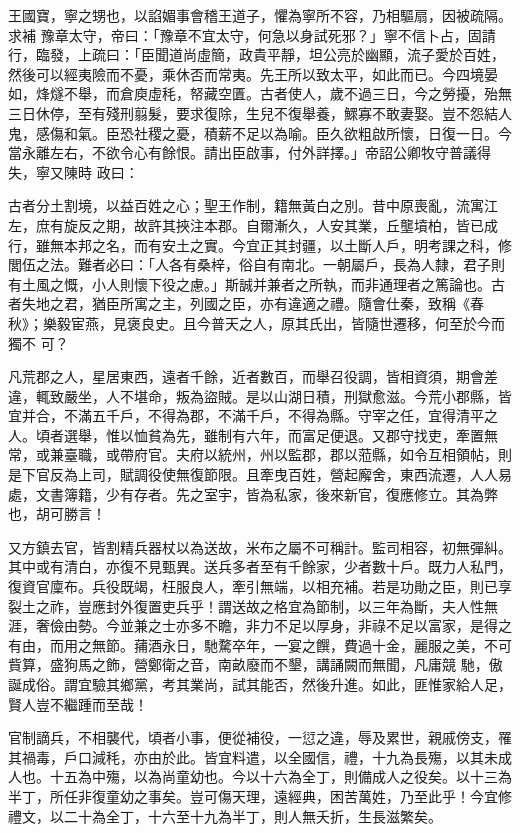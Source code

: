 \begin{pinyinscope}
 王國寶，寧之甥也，以諂媚事會稽王道子，懼為寧所不容，乃相驅扇，因被疏隔。求補
 豫章太守，帝曰：「豫章不宜太守，何急以身試死邪？」寧不信卜占，固請行，臨發，上疏曰：「臣聞道尚虛簡，政貴平靜，坦公亮於幽顯，流子愛於百姓，然後可以經夷險而不憂，乘休否而常夷。先王所以致太平，如此而已。今四境晏如，烽燧不舉，而倉庾虛秏，帑藏空匱。古者使人，歲不過三日，今之勞擾，殆無三日休停，至有殘刑翦髮，要求復除，生兒不復舉養，鰥寡不敢妻娶。豈不怨結人鬼，感傷和氣。臣恐社稷之憂，積薪不足以為喻。臣久欲粗啟所懷，日復一日。今當永離左右，不欲令心有餘恨。請出臣啟事，付外詳擇。」帝詔公卿牧守普議得失，寧又陳時
 政曰：



 古者分土割境，以益百姓之心；聖王作制，籍無黃白之別。昔中原喪亂，流寓江左，庶有旋反之期，故許其挾注本郡。自爾漸久，人安其業，丘壟墳柏，皆已成行，雖無本邦之名，而有安土之實。今宜正其封疆，以土斷人戶，明考課之科，修閭伍之法。難者必曰：「人各有桑梓，俗自有南北。一朝屬戶，長為人隸，君子則有土風之慨，小人則懷下役之慮。」斯誠并兼者之所執，而非通理者之篤論也。古者失地之君，猶臣所寓之主，列國之臣，亦有違適之禮。隨會仕秦，致稱《春秋》；樂毅宦燕，見褒良史。且今普天之人，原其氏出，皆隨世遷移，何至於今而獨不
 可？



 凡荒郡之人，星居東西，遠者千餘，近者數百，而舉召役調，皆相資須，期會差違，輒致嚴坐，人不堪命，叛為盜賊。是以山湖日積，刑獄愈滋。今荒小郡縣，皆宜并合，不滿五千戶，不得為郡，不滿千戶，不得為縣。守宰之任，宜得清平之人。頃者選舉，惟以恤貧為先，雖制有六年，而富足便退。又郡守找吏，牽置無常，或兼臺職，或帶府官。夫府以統州，州以監郡，郡以蒞縣，如令互相領帖，則是下官反為上司，賦調役使無復節限。且牽曳百姓，營起廨舍，東西流遷，人人易處，文書簿籍，少有存者。先之室宇，皆為私家，後來新官，復應修立。其為弊也，胡可勝言！



 又方鎮去官，皆割精兵器杖以為送故，米布之屬不可稱計。監司相容，初無彈糾。其中或有清白，亦復不見甄異。送兵多者至有千餘家，少者數十戶。既力人私門，復資官廩布。兵役既竭，枉服良人，牽引無端，以相充補。若是功勛之臣，則已享裂土之祚，豈應封外復置吏兵乎！謂送故之格宜為節制，以三年為斷，夫人性無涯，奢儉由勢。今並兼之士亦多不瞻，非力不足以厚身，非祿不足以富家，是得之有由，而用之無節。蒱酒永日，馳騖卒年，一宴之饌，費過十金，麗服之美，不可貲算，盛狗馬之飾，營鄭衛之音，南畝廢而不墾，講誦闕而無聞，凡庸競
 馳，傲誕成俗。謂宜驗其鄉黨，考其業尚，試其能否，然後升進。如此，匪惟家給人足，賢人豈不繼踵而至哉！



 官制謫兵，不相襲代，頃者小事，便從補役，一愆之違，辱及累世，親戚傍支，罹其禍毒，戶口減秏，亦由於此。皆宜料遣，以全國信，禮，十九為長殤，以其未成人也。十五為中殤，以為尚童幼也。今以十六為全丁，則備成人之役矣。以十三為半丁，所任非復童幼之事矣。豈可傷天理，遠經典，困苦萬姓，乃至此乎！今宜修禮文，以二十為全丁，十六至十九為半丁，則人無夭折，生長滋繁矣。




\end{pinyinscope}
